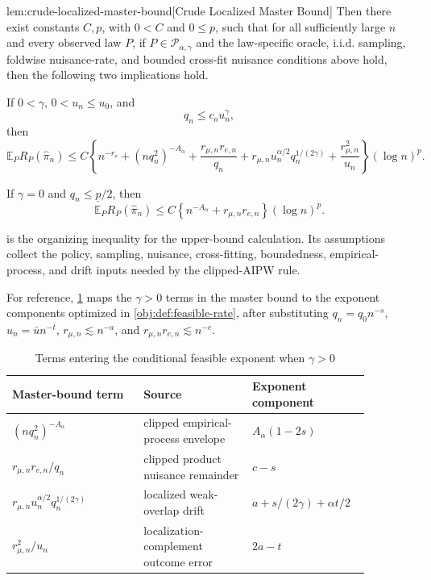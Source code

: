 \begin{lemmav}{lem:crude-localized-master-bound}[Crude Localized Master Bound]
Then there exist constants \(C,p\), with \(0<C\) and \(0\le p\), such that for all sufficiently large \(n\) and every observed law \(P\), if \(P\in\mathcal P_{\alpha,\gamma}\) and the law-specific oracle, i.i.d. sampling, foldwise nuisance-rate, and bounded cross-fit nuisance conditions above hold, then the following two implications hold.

If \(0<\gamma\), \(0<u_n\le u_0\), and
\[
q_n\le c_o u_n^\gamma,
\]
then
\[
\mathbb E_P R_P(\widehat\pi_n)
\le
C\left\{
n^{-r_\star}
+(nq_n^2)^{-A_\alpha}
+\frac{r_{\mu,n}r_{e,n}}{q_n}
+r_{\mu,n}u_n^{\alpha/2}q_n^{1/(2\gamma)}
+\frac{r_{\mu,n}^2}{u_n}
\right\}(\log n)^p .
\]

If \(\gamma=0\) and \(q_n\le \underline p/2\), then
\[
\mathbb E_P R_P(\widehat\pi_n)
\le
C\left\{
n^{-A_\alpha}+r_{\mu,n}r_{e,n}
\right\}(\log n)^p .
\]
\end{lemmav}

 is the organizing inequality for the upper-bound calculation.  Its assumptions collect the policy, sampling, nuisance, cross-fitting, boundedness, empirical-process, and drift inputs needed by the clipped-AIPW rule.

For reference, \cref{tab:feasible-balance} maps the \(\gamma>0\) terms in the master bound to the exponent components optimized in \cref{obj:def:feasible-rate}, after substituting \(q_n=q_0n^{-s}\), \(u_n=\bar u n^{-t}\), \(r_{\mu,n}\lesssim n^{-a}\), and \(r_{\mu,n}r_{e,n}\lesssim n^{-c}\).

\begin{table}[t]
\centering
\caption{Terms entering the conditional feasible exponent when \(\gamma>0\)}
\label{tab:feasible-balance}
\begin{tabular}{p{0.34\linewidth}p{0.28\linewidth}p{0.26\linewidth}}
\hline
Master-bound term & Source & Exponent component \\
\hline
\((nq_n^2)^{-A_\alpha}\) & clipped empirical-process envelope & \(A_\alpha(1-2s)\) \\
\(r_{\mu,n}r_{e,n}/q_n\) & clipped product nuisance remainder & \(c-s\) \\
\(r_{\mu,n}u_n^{\alpha/2}q_n^{1/(2\gamma)}\) & localized weak-overlap drift & \(a+s/(2\gamma)+\alpha t/2\) \\
\(r_{\mu,n}^2/u_n\) & localization-complement outcome error & \(2a-t\) \\
\hline
\end{tabular}
\end{table}

